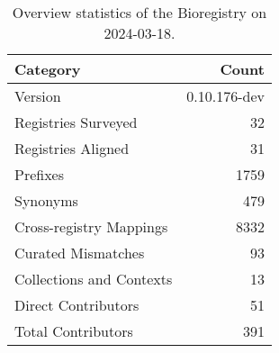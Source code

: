 \begin{table}
\caption{Overview statistics of the Bioregistry on 2024-03-18.}
\label{tab:bioregistry-summary}
\begin{tabular}{lr}
\toprule
Category & Count \\
\midrule
Version & 0.10.176-dev \\
Registries Surveyed & 32 \\
Registries Aligned & 31 \\
Prefixes & 1759 \\
Synonyms & 479 \\
Cross-registry Mappings & 8332 \\
Curated Mismatches & 93 \\
Collections and Contexts & 13 \\
Direct Contributors & 51 \\
Total Contributors & 391 \\
\bottomrule
\end{tabular}
\end{table}
